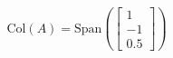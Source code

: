 \documentclass[preview]{standalone}
\begin{document}
\begin{align*}
\text{Col}(A)  = \text{Span}\left(\begin{bmatrix} 1 \\ -1 \\ 0.5 \end{bmatrix}\right)
\end{align*}
\end{document}
